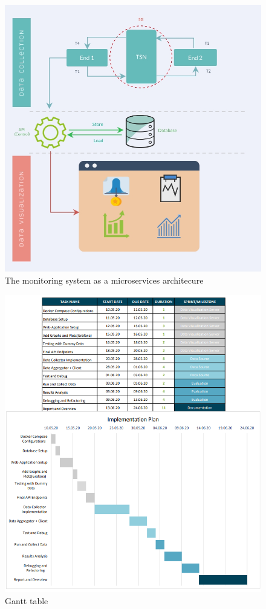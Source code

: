 \begin{figure}[H]
    \begin{center}
        \includegraphics[scale=0.27]{resources/images/Tech-Flowchart.jpg}
        \caption{The monitoring system as a microservices architecure}
        \label{fig:flowchart}
    \end{center}
\end{figure}

\begin{figure}[H]
\includegraphics[scale=0.8]{resources/images/gantt.png}
\caption{Gantt table}
\label{fig:gantt_v}
\end{figure}

